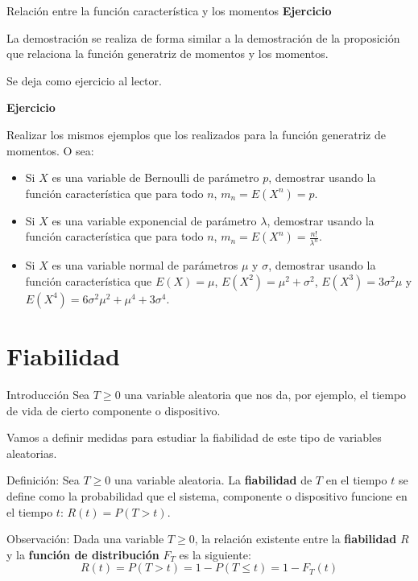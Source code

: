 \documentclass[
  ignorenonframetext,
  aspectratio=169]{beamer}
\begin{document}
\begin{frame}{Relación entre la función característica y los momentos}
\protect\hypertarget{relaciuxf3n-entre-la-funciuxf3n-caracteruxedstica-y-los-momentos-1}{}
\textbf{Ejercicio}

La demostración se realiza de forma similar a la demostración de la
proposición que relaciona la función generatriz de momentos y los
momentos.

Se deja como ejercicio al lector.

\textbf{Ejercicio}

Realizar los mismos ejemplos que los realizados para la función
generatriz de momentos. O sea:

\begin{itemize}
\item
  Si \(X\) es una variable de Bernoulli de parámetro \(p\), demostrar
  usando la función característica que para todo \(n\),
  \(m_n = E\left(X^n\right)=p\).
\item
  Si \(X\) es una variable exponencial de parámetro \(\lambda\),
  demostrar usando la función característica que para todo \(n\),
  \(m_n = E\left(X^n\right)=\frac{n!}{\lambda^n}\).
\item
  Si \(X\) es una variable normal de parámetros \(\mu\) y \(\sigma\),
  demostrar usando la función característica que \(E(X)=\mu\),
  \(E\left(X^2\right)=\mu^2+\sigma^2\),
  \(E\left(X^3\right)=3\sigma^2\mu\) y
  \(E\left(X^4\right)=6\sigma^2\mu^2+\mu^4+3\sigma^4\).
\end{itemize}
\end{frame}

\hypertarget{fiabilidad}{%
\section{Fiabilidad}\label{fiabilidad}}

\begin{frame}{Introducción}
\protect\hypertarget{introducciuxf3n-1}{}
Sea \(T\geq 0\) una variable aleatoria que nos da, por ejemplo, el
tiempo de vida de cierto componente o dispositivo.

Vamos a definir medidas para estudiar la fiabilidad de este tipo de
variables aleatorias.

Definición: Sea \(T\geq 0\) una variable aleatoria. La
\textbf{fiabilidad} de \(T\) en el tiempo \(t\) se define como la
probabilidad que el sistema, componente o dispositivo funcione en el
tiempo \(t\): \(R(t)=P(T>t)\).

Observación: Dada una variable \(T\geq 0\), la relación existente entre
la \textbf{fiabilidad} \(R\) y la \textbf{función de distribución}
\(F_T\) es la siguiente: \[
R(t)=P(T>t)=1-P(T\leq t)=1-F_T (t)
\]
\end{frame}
\end{document}
